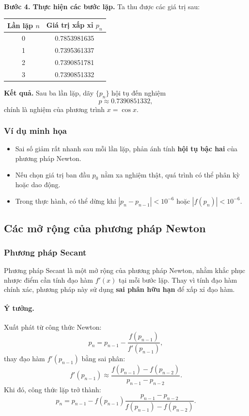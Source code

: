 \textbf{Bước 4. Thực hiện các bước lặp.}
Ta thu được các giá trị sau:

\begin{center}
\begin{tabular}{|c|c|}
\hline
\textbf{Lần lặp} $n$ & \textbf{Giá trị xấp xỉ} $p_n$ \\
\hline
0 & 0.7853981635 \\
1 & 0.7395361337 \\
2 & 0.7390851781 \\
3 & 0.7390851332 \\
\hline
\end{tabular}
\end{center}

\textbf{Kết quả.}
Sau ba lần lặp, dãy $\{p_n\}$ hội tụ đến nghiệm
\[
    p \approx 0.7390851332,
\]
chính là nghiệm của phương trình $x = \cos x$.

\subsubsection*{Ví dụ minh họa}
\begin{itemize}
    \item Sai số giảm rất nhanh sau mỗi lần lặp, phản ánh tính \textbf{hội tụ bậc hai} của phương pháp Newton.
    \item Nếu chọn giá trị ban đầu $p_0$ nằm xa nghiệm thật, quá trình có thể phân kỳ hoặc dao động.
    \item Trong thực hành, có thể dừng khi $|p_{n} - p_{n-1}| < 10^{-6}$ hoặc $|f(p_n)| < 10^{-6}$.
\end{itemize}

\subsection{Các mở rộng của phương pháp Newton}
\subsubsection{Phương pháp Secant}
Phương pháp Secant là một mở rộng của phương pháp Newton, 
nhằm khắc phục nhược điểm cần tính đạo hàm $f'(x)$ tại mỗi bước lặp. 
Thay vì tính đạo hàm chính xác, phương pháp này sử dụng \textbf{sai phân hữu hạn} để xấp xỉ đạo hàm.

\paragraph*{Ý tưởng.}
Xuất phát từ công thức Newton:
\[
    p_{n} = p_{n-1} - \frac{f(p_{n-1})}{f'(p_{n-1})},
\]
thay đạo hàm $f'(p_{n-1})$ bằng sai phân:
\[
    f'(p_{n-1}) \approx 
    \frac{f(p_{n-1}) - f(p_{n-2})}{p_{n-1} - p_{n-2}}.
\]
Khi đó, công thức lặp trở thành:
\[
    p_{n} = p_{n-1} - f(p_{n-1})
    \frac{p_{n-1} - p_{n-2}}{f(p_{n-1}) - f(p_{n-2})}.
\]

